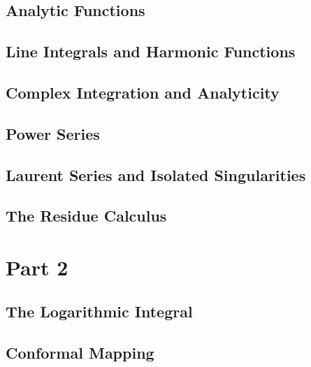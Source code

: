 \documentclass[12pt, a4paper, oneside, openright, titlepage]{book}
\begin{document}
\chapter{Analytic Functions}



\chapter{Line Integrals and Harmonic Functions}



\chapter{Complex Integration and Analyticity}



\chapter{Power Series}




\chapter{Laurent Series and Isolated Singularities}



\chapter{The Residue Calculus}



\part{Part 2}

\chapter{The Logarithmic Integral}




\chapter{Conformal Mapping}
\end{document}
